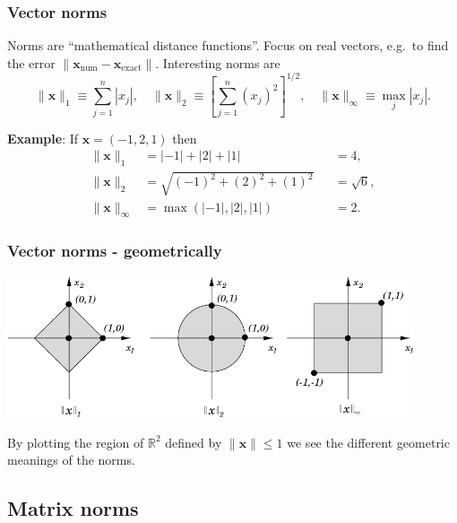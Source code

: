 \documentclass{beamer}
\newcommand{\bx}{{\boldsymbol{x}}}
\begin{document}
 \begin{frame}
   \frametitle{Vector norms}

   Norms are ``mathematical distance functions''. Focus on real
   vectors, e.g.\ to find the error $\| \bx_{\text{num}} -
   \bx_{\text{exact}} \|$. Interesting norms are
   \begin{equation*}
     \| \bx \|_1 \equiv \sum_{j=1}^n | x_j |, \quad
     \| \bx \|_2 \equiv \left[ \sum_{j=1}^n ( x_j )^2 \right]^{1/2}, \quad
     \| \bx \|_{\infty} \equiv \max_j | x_j |.
   \end{equation*} \pause

   {\bf Example}: If $\bx = (-1, 2, 1)$ then
   \begin{align*}
     \| \bx \|_1 & = | -1 | + | 2 | + | 1| &&= 4, \\
     \| \bx \|_2 & = \sqrt{(-1)^2 + (2)^2 + (1)^2} &&= \sqrt{6}, \\
     \| \bx \|_{\infty} & = \max (| -1 |, | 2 |, | 1 |) && = 2.
   \end{align*}


 \end{frame}

 \begin{frame}
   \frametitle{Vector norms - geometrically}

   \begin{center}
     \includegraphics[width=0.9\textwidth]{figures/norms}
   \end{center}
   By plotting the region of $\mathbb{R}^2$ defined by $\| \bx \| \le
   1$ we see the different geometric meanings of the norms.

 \end{frame}


 \subsection{Matrix norms}
\end{document}
